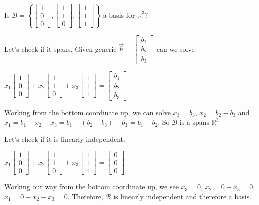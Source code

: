 \begin{example}
Is $\mathcal{B}=\left\{\begin{bmatrix}1 \\ 0 \\ 0 \end{bmatrix}, \begin{bmatrix}1 \\ 1 \\ 0 \end{bmatrix}, \begin{bmatrix}1 \\ 1 \\ 1 \end{bmatrix}\right\}$ a basis for $\mathbb{R}^3$?

Let's check if it spans. Given generic $\vec{b}=\begin{bmatrix}b_1\\ b_2 \\ b_3\end{bmatrix}$ can we solve

$x_1\begin{bmatrix}1 \\ 0 \\ 0 \end{bmatrix} +x_2\begin{bmatrix}1 \\ 1 \\ 0 \end{bmatrix}+x_3 \begin{bmatrix}1 \\ 1 \\ 1 \end{bmatrix}=
\begin{bmatrix}b_1\\ b_2 \\ b_3\end{bmatrix}$

Working from the bottom coordinate up, we can solve $x_3=b_3$, $x_2=b_2-b_3$ and $x_1=b_1-x_2-x_3=b_1-(b_2-b_3)-b_3=b_1-b_2$. So $\mathcal{B}$ is a spans $\mathbb{R}^3$

Let's check if it is linearly independent. 

$x_1\begin{bmatrix}1 \\ 0 \\ 0 \end{bmatrix} +x_2\begin{bmatrix}1 \\ 1 \\ 0 \end{bmatrix}+x_3 \begin{bmatrix}1 \\ 1 \\ 1 \end{bmatrix}=
\begin{bmatrix}0\\ 0 \\ 0\end{bmatrix}$

Working our way from the bottom coordinate up, we see $x_3=0$, $x_2=0-x_3=0$, $x_1=0-x_2-x_3=0$. Therefore, $\mathcal{B}$ is linearly independent and therefore a basis.
\end{example}

